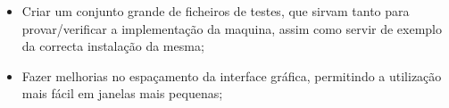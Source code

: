 \documentclass{report}
\begin{document}
\begin{itemize}
\item Criar um conjunto grande de ficheiros de testes, que sirvam tanto para provar/verificar a
implementação da maquina, assim como servir de exemplo da correcta instalação da mesma;
\item Fazer melhorias no espaçamento da interface gráfica, permitindo a utilização mais fácil em janelas mais pequenas;
\end{itemize}

%
%
\end{document}
